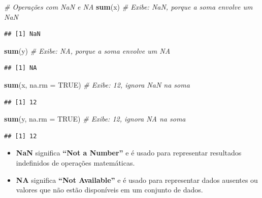 \documentclass[
]{book}
\newenvironment{Shaded}{\begin{snugshade}}{\end{snugshade}}
\newcommand{\AttributeTok}[1]{\textcolor[rgb]{0.13,0.29,0.53}{#1}}
\newcommand{\CommentTok}[1]{\textcolor[rgb]{0.56,0.35,0.01}{\textit{#1}}}
\newcommand{\ConstantTok}[1]{\textcolor[rgb]{0.56,0.35,0.01}{#1}}
\newcommand{\FunctionTok}[1]{\textcolor[rgb]{0.13,0.29,0.53}{\textbf{#1}}}
\newcommand{\NormalTok}[1]{#1}
\theoremstyle{definition}
\theoremstyle{definition}
\theoremstyle{definition}
\theoremstyle{definition}
\theoremstyle{remark}
\begin{document}
\begin{Shaded}
\begin{Highlighting}[]
\CommentTok{\# Operações com NaN e NA}
\FunctionTok{sum}\NormalTok{(x)  }\CommentTok{\# Exibe: NaN, porque a soma envolve um NaN}
\end{Highlighting}
\end{Shaded}

\begin{verbatim}
## [1] NaN
\end{verbatim}

\begin{Shaded}
\begin{Highlighting}[]
\FunctionTok{sum}\NormalTok{(y)  }\CommentTok{\# Exibe: NA, porque a soma envolve um NA}
\end{Highlighting}
\end{Shaded}

\begin{verbatim}
## [1] NA
\end{verbatim}

\begin{Shaded}
\begin{Highlighting}[]
\FunctionTok{sum}\NormalTok{(x, }\AttributeTok{na.rm =} \ConstantTok{TRUE}\NormalTok{)  }\CommentTok{\# Exibe: 12, ignora NaN na soma}
\end{Highlighting}
\end{Shaded}

\begin{verbatim}
## [1] 12
\end{verbatim}

\begin{Shaded}
\begin{Highlighting}[]
\FunctionTok{sum}\NormalTok{(y, }\AttributeTok{na.rm =} \ConstantTok{TRUE}\NormalTok{)  }\CommentTok{\# Exibe: 12, ignora NA na soma}
\end{Highlighting}
\end{Shaded}

\begin{verbatim}
## [1] 12
\end{verbatim}

\begin{itemize}
\item
  \textbf{NaN} significa \textbf{``Not a Number''} e é usado para representar resultados indefinidos de operações matemáticas.
\item
  \textbf{NA} significa \textbf{``Not Available''} e é usado para representar dados ausentes ou valores que não estão disponíveis em um conjunto de dados.
\end{itemize}
\end{document}
